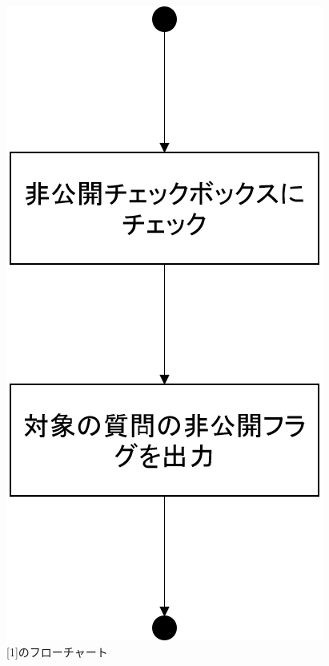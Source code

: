 \begin{figure}[htbp]
  \begin{center}
    \includegraphics[width=0.4\linewidth,clip]{./img/q_reply/sub1.png}
    \caption{[1]のフローチャート}\label{fig:qreplyflow0}
  \end{center}
\end{figure}

